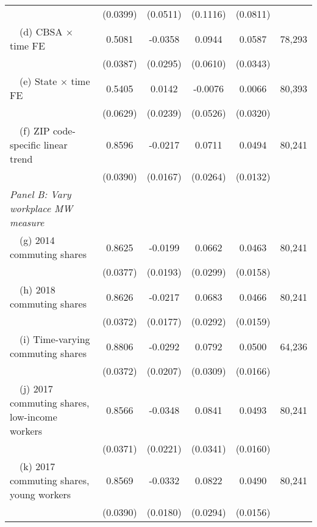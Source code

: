 \begin{landscape}
\begin{table}[ht!]
\begin{tabular}{@{}lccccc@{}}
                                                             & (0.0399) & (0.0511) & (0.1116) & (0.0811) &      \\
        $\quad$(d) CBSA $\times$ time FE                     &  0.5081  &  -0.0358  &  0.0944  &  0.0587  & 78,293 \\
                                                             & (0.0387) & (0.0295) & (0.0610) & (0.0343) &      \\
        $\quad$(e) State $\times$ time FE                    &  0.5405  &  0.0142  &  -0.0076  &  0.0066  & 80,393 \\
                                                             & (0.0629) & (0.0239) & (0.0526) & (0.0320) &      \\
        $\quad$(f) ZIP code-specific linear trend            &  0.8596  &  -0.0217  &  0.0711  &  0.0494  & 80,241 \\
                                                             & (0.0390) & (0.0167) & (0.0264) & (0.0132) &      \\
        \textit{Panel B: Vary workplace MW measure}          &       &       &       &       &      \\
        $\quad$(g) 2014 commuting shares                     &  0.8625  &  -0.0199  &  0.0662  &  0.0463  & 80,241 \\
                                                             & (0.0377) & (0.0193) & (0.0299) & (0.0158) &      \\
        $\quad$(h) 2018 commuting shares                     &  0.8626  &  -0.0217  &  0.0683  &  0.0466  & 80,241 \\
                                                             & (0.0372) & (0.0177) & (0.0292) & (0.0159) &      \\
        $\quad$(i) Time-varying commuting shares             &  0.8806  &  -0.0292  &  0.0792  &  0.0500  & 64,236 \\
                                                             & (0.0372) & (0.0207) & (0.0309) & (0.0166) &      \\
        $\quad$(j) 2017 commuting shares, low-income workers &  0.8566  &  -0.0348  &  0.0841  &  0.0493  & 80,241 \\
                                                             & (0.0371) & (0.0221) & (0.0341) & (0.0160) &      \\
        $\quad$(k) 2017 commuting shares, young workers      &  0.8569  &  -0.0332  &  0.0822  &  0.0490  & 80,241 \\
                                                             & (0.0390) & (0.0180) & (0.0294) & (0.0156) &      \\ \bottomrule
    \end{tabular}


\end{table}
\end{landscape}

